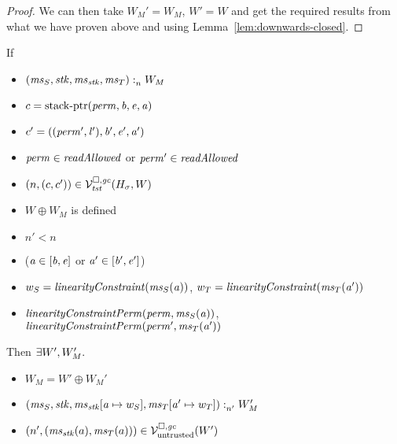 \begin{proof}
  We can then take $W_M' = W_M$, $W' = W$ and get the required results from what we have proven above and using Lemma~\ref{lem:downwards-closed}.
\end{proof}

\begin{lemma}
  \label{lem:load-stack-cap-works}
  If
  \begin{itemize}
  \item $\memSat{(\ms_S,\stk,\ms_\stk,\ms_T)}{W_M}$
  \item $c = \stkptr{\perm,\baddr,\eaddr,\aaddr}$
  \item $c' = ((\perm',\lin'),\baddr',\eaddr',\aaddr')$
  \item $\perm \in \readAllowed{}$ or $\perm' \in \readAllowed{}$
  \item $\npair{(c,c')}\in\lrvg{\trust}(H_\sigma,W)$
  \item $W \oplus W_M$ is defined
  \item $n' < n$
  \item ($\aaddr \in [\baddr,\eaddr]$ or $\aaddr' \in [\baddr',\eaddr']$)
  \item $w_S = \linCons{\ms_S(\aaddr)}$, $w_T = \linCons{\ms_T(\aaddr')}$
  \item $\linConsPerm{\perm}{\ms_S(\aaddr)}$, $\linConsPerm{\perm'}{\ms_T(\aaddr')}$
  \end{itemize}
  Then $\exists W', W_M'\ldotp$
  \begin{itemize}
  \item $W_M = W' \oplus W_M'$
  \item $\memSat[n']{(\ms_S,\stk,\ms_\stk\update{\aaddr}{w_S},\ms_T\update{\aaddr'}{w_T})}{W_M'}$
  \item $\npair[n']{(\ms_\stk(a),\ms_T(a))} \in \lrv(W')$
  \end{itemize}
\end{lemma}
